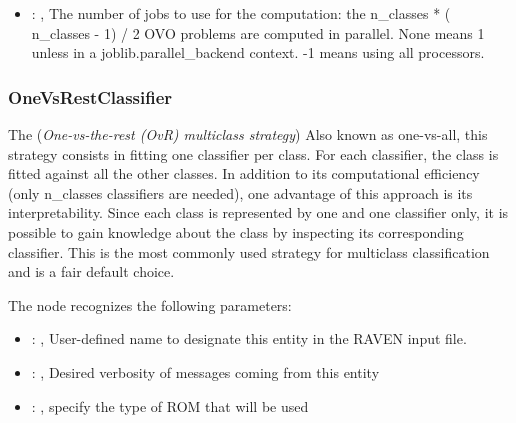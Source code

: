 \begin{itemize}
    \item {}: ,
      The number of jobs to use for the computation: the n\_classes * ( n\_classes - 1) / 2 OVO
      problems are computed in parallel. None means 1 unless in a joblib.parallel\_backend
      context. -1 means using all processors.
  \end{itemize}


\subsubsection{OneVsRestClassifier}
  The  (\textit{One-vs-the-rest (OvR) multiclass strategy})
  Also known as one-vs-all, this strategy consists in fitting one classifier per class. For each
  classifier, the class is fitted against all the other classes. In addition to its computational
  efficiency (only n\_classes classifiers are needed), one advantage of this approach is its
  interpretability. Since each class is represented by one and one classifier only, it is
  possible to gain knowledge about the class by inspecting its corresponding classifier.
  This is the most commonly used strategy for multiclass classification and is a fair default
  choice.                         

  The  node recognizes the following parameters:
    \begin{itemize}
      \item {}: ,
        User-defined name to designate this entity in the RAVEN input file.
      \item {}: ,
        Desired verbosity of messages coming from this entity
      \item {}: ,
        specify the type of ROM that will be used
  \end{itemize}


